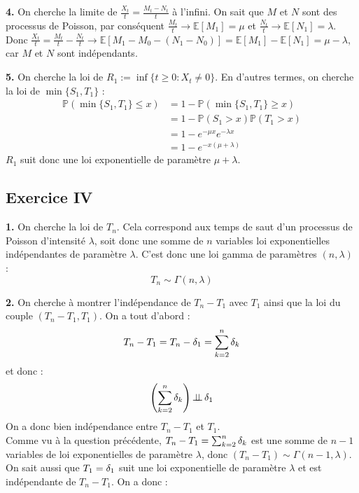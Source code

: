 \documentclass[a4paper,10pt]{report}
\newcommand{\esp}[1]{\mathbb{E}\left[#1\right]} %
\newcommand{\proba}[1]{\mathbb{P} \left(#1\right)} %
\DeclareMathOperator{\ind}{\perp \!\!\! \perp} %
\begin{document}

\textbf{4.} On cherche la limite de $\frac{X_t}{t} = \frac{M_t - N_t}{t}$ à l'infini.
On sait que $M$ et $N$ sont des processus de Poisson, par conséquent $\frac{M_t}{t} \rightarrow \esp{M_1} = \mu$ et $\frac{N_t}{t} \rightarrow \esp{N_1} = \lambda$. Donc $\frac{X_t}{t} = \frac{M_t}{t} - \frac{N_t}{t} \rightarrow \esp{M_1 - M_0 - (N_1 - N_0)} = \esp{M_1} - \esp{N_1} = \mu - \lambda$, car $M$ et $N$ sont indépendants.
\newline


\textbf{5.} On cherche la loi de $R_1 := \inf\{t \geq 0 : X_t \neq 0 \}$. En d'autres termes, on cherche la loi de $\min\{S_1, T_1\}$ : 
$$
\begin{aligned}
\proba{\min\{S_1, T_1\} \leq x} & = 1 - \proba{\min\{S_1, T_1\} \geq x} \\
& = 1 - \proba{S_1 > x}\proba{T_1 > x} \\
& = 1 - e^{-\mu x}e^{-\lambda x} \\
& = 1 - e^{-x(\mu + \lambda)}
\end{aligned}
$$
$R_1$ suit donc une loi exponentielle de paramètre $\mu + \lambda$.
\newline


\subsection*{Exercice IV}


\textbf{1.} On cherche la loi de $T_n$. Cela correspond aux temps de saut d'un processus de Poisson d'intensité $\lambda$, soit donc une somme de $n$ variables loi exponentielles indépendantes de paramètre $\lambda$. C'est donc une loi gamma de paramètres $(n,\lambda)$ : 
$$
T_n \sim \Gamma(n, \lambda)
$$
\newline


\textbf{2.} On cherche à montrer l'indépendance de $T_n - T_1$ avec $T_1$ ainsi que la loi du couple $(T_n - T_1, T_1)$. On a tout d'abord :
$$
T_n - T_1 = T_n - \var_1 = \sum_{k = 2}^n \var_k
$$
et donc :
$$
\left( \sum_{k = 2}^n \var_k \right) \ind \var_1
$$
On a donc bien indépendance entre $T_n - T_1$ et $T_1$.\\

Comme vu à la question précédente, $T_n - T_1 = \sum_{k = 2}^n \var_k$ est une somme de $n-1$ variables de loi exponentielles de paramètre $\lambda$, donc $(T_n - T_1) \sim \Gamma(n-1, \lambda)$. On sait aussi que $T_1 = \var_1$ suit une loi exponentielle de paramètre $\lambda$ et est indépendante de $T_n - T_1$. On a donc :
\end{document}
